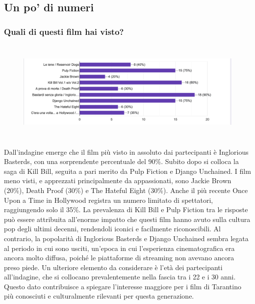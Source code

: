 \documentclass[12pt]{article} %
\begin{document}
\subsection{Un po' di numeri}
\subsubsection*{Quali di questi film hai visto?}
\begin{flushleft}
\begin{figure}[H]
    \includegraphics[width = 15cm, height = 5cm]{grafico1.png}
\end{figure}
Dall'indagine emerge che il film più visto in assoluto dai partecipanti è Inglorious Basterds, con una sorprendente percentuale del 90\%. 
Subito dopo si colloca la saga di Kill Bill, seguita a pari merito da Pulp Fiction e Django Unchained.  
I film meno visti, e apprezzati principalmente da appassionati, sono Jackie Brown (20\%), Death Proof (30\%) e The Hateful Eight (30\%). 
Anche il più recente Once Upon a Time in Hollywood registra un numero limitato di spettatori, raggiungendo solo il 35\%.  
La prevalenza di Kill Bill e Pulp Fiction tra le risposte può essere attribuita all’enorme impatto che questi film hanno avuto sulla cultura pop degli ultimi decenni, rendendoli iconici e facilmente riconoscibili. 
Al contrario, la popolarità di Inglorious Basterds e Django Unchained sembra legata al periodo in cui sono usciti, un’epoca in cui l’esperienza cinematografica era ancora molto diffusa, poiché le piattaforme di streaming non avevano ancora preso piede.  
Un ulteriore elemento da considerare è l’età dei partecipanti all’indagine, che si collocano prevalentemente nella fascia tra i 22 e i 30 anni. 
Questo dato contribuisce a spiegare l’interesse maggiore per i film di Tarantino più conosciuti e culturalmente rilevanti per questa generazione.
\end{flushleft}
\break
\end{document}
